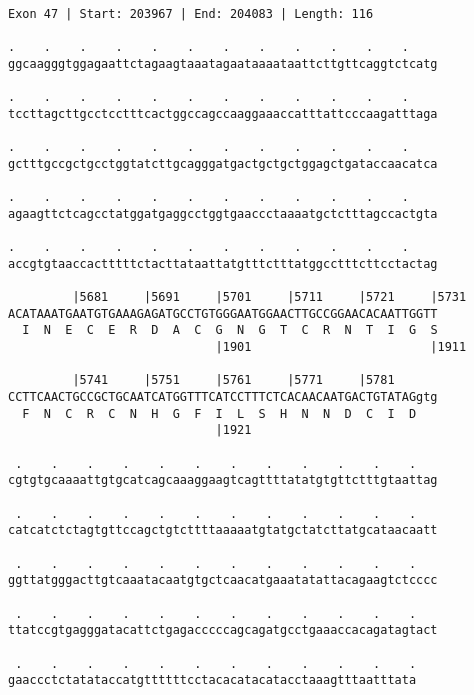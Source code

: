 \documentclass{article}
\begin{document}
\begin{Verbatim}
Exon 47 | Start: 203967 | End: 204083 | Length: 116
 
.    .    .    .    .    .    .    .    .    .    .    .    
ggcaagggtggagaattctagaagtaaatagaataaaataattcttgttcaggtctcatg
  
.    .    .    .    .    .    .    .    .    .    .    .    
tccttagcttgcctcctttcactggccagccaaggaaaccatttattcccaagatttaga
  
.    .    .    .    .    .    .    .    .    .    .    .    
gctttgccgctgcctggtatcttgcagggatgactgctgctggagctgataccaacatca
  
.    .    .    .    .    .    .    .    .    .    .    .    
agaagttctcagcctatggatgaggcctggtgaaccctaaaatgctctttagccactgta
  
.    .    .    .    .    .    .    .    .    .    .    .    
accgtgtaaccactttttctacttataattatgtttctttatggcctttcttcctactag
  
         |5681     |5691     |5701     |5711     |5721     |5731
ACATAAATGAATGTGAAAGAGATGCCTGTGGGAATGGAACTTGCCGGAACACAATTGGTT
  I  N  E  C  E  R  D  A  C  G  N  G  T  C  R  N  T  I  G  S
                             |1901                         |1911
  
         |5741     |5751     |5761     |5771     |5781      
CCTTCAACTGCCGCTGCAATCATGGTTTCATCCTTTCTCACAACAATGACTGTATAGgtg
  F  N  C  R  C  N  H  G  F  I  L  S  H  N  N  D  C  I  D   
                             |1921                          
  
 .    .    .    .    .    .    .    .    .    .    .    .   
cgtgtgcaaaattgtgcatcagcaaaggaagtcagttttatatgtgttctttgtaattag
  
 .    .    .    .    .    .    .    .    .    .    .    .   
catcatctctagtgttccagctgtcttttaaaaatgtatgctatcttatgcataacaatt
  
 .    .    .    .    .    .    .    .    .    .    .    .   
ggttatgggacttgtcaaatacaatgtgctcaacatgaaatatattacagaagtctcccc
  
 .    .    .    .    .    .    .    .    .    .    .    .   
ttatccgtgagggatacattctgagacccccagcagatgcctgaaaccacagatagtact
  
 .    .    .    .    .    .    .    .    .    .    .    .
gaaccctctatataccatgttttttcctacacatacatacctaaagtttaatttata
\end{Verbatim}
\newpage
\end{document}
